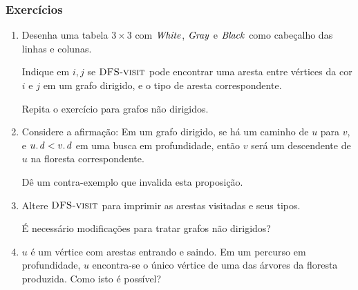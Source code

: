 \documentclass{beamer}
\begin{document}
\begin{frame}
\frametitle{Exercícios}

\begin{enumerate}
\item Desenha uma tabela $3 \times 3$ com $\id{White}$, $\id{Gray}$ e
  $\id{Black}$ como cabeçalho das linhas e colunas.

  Indique em $i, j$ se $\textnormal{\scshape DFS-visit}$ pode encontrar uma aresta entre
  vértices da cor $i$ e $j$ em um grafo dirigido, e o tipo de aresta
  correspondente.

  Repita o exercício para grafos não dirigidos.

\item Considere a afirmação: Em um grafo dirigido, se há um caminho
de $u$ para $v$, e $\attrib{u}{d} < \attrib{v}{d}$ em uma busca em profundidade,
então $v$ será um descendente de $u$ na floresta correspondente.

Dê um contra-exemplo que invalida esta proposição.

\item Altere $\textnormal{\scshape DFS-visit}$ para imprimir as arestas visitadas e seus tipos. 

É necessário modificações para tratar grafos não dirigidos?

\item $u$ é um vértice com arestas entrando e saindo. Em um percurso em
  profundidade, $u$ encontra-se o único vértice de uma das árvores da floresta
  produzida. Como isto é possível?
\end{enumerate}

\end{frame}
\end{document}
